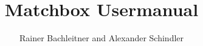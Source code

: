 \documentclass[A4]{hitec}
\title{Matchbox Usermanual}
\author{Rainer Bachleitner and Alexander Schindler}
\begin{document}


\tableofcontents

\pagebreak

\listoffigures

\listoftables

\pagebreak



\pagebreak



\pagebreak



\pagebreak



\pagebreak



\pagebreak



\end{document}
